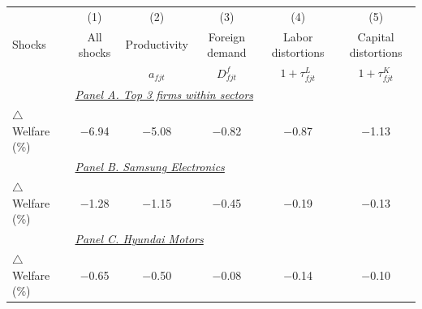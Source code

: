 \begin{tabular}{lccccc}
\toprule
  & (1) & (2) & (3) & (4) & (5) \\
Shocks & All shocks & Productivity & Foreign demand & Labor distortions & Capital distortions \\
 & & $a_{fjt}$ & $D_{fjt}^{f}$ & $1 + \tau_{fjt}^{L}$ & $1 + \tau_{fjt}^{K}$ \\
\midrule
& \multicolumn{4}{l}{\textit{\underline{Panel A. Top 3 firms within sectors}}} \\[0.5em]
$\triangle$ Welfare (\%) & $-$6.94 & $-$5.08 & $-$0.82 & $-$0.87 & $-$1.13 \\[1em]
& \multicolumn{4}{l}{\textit{\underline{Panel B. Samsung Electronics}}} \\
$\triangle$ Welfare (\%) & $-$1.28 & $-$1.15 & $-$0.45 & $-$0.19 & $-$0.13 \\[1em]
& \multicolumn{4}{l}{\textit{\underline{Panel C. Hyundai Motors}}} \\
$\triangle$ Welfare (\%) & $-$0.65 & $-$0.50 & $-$0.08 & $-$0.14 & $-$0.10 \\
\bottomrule
\end{tabular}
